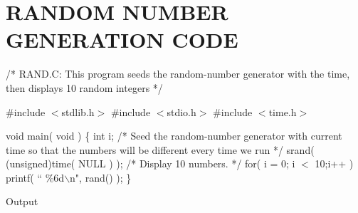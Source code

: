 \chapter{RANDOM NUMBER GENERATION CODE}

\noindent /* RAND.C: This program seeds the random-number generator with the time, then displays 10 random integers */ \newline

\noindent \#include $<$stdlib.h$>$ \newline
\noindent \#include $<$stdio.h$>$ \newline
\noindent \#include $<$time.h$>$ \newline

\noindent void main( void ) \newline
\noindent \{
   \newline \hspace*{2em} int i;
   \newline \hspace*{2em} /* Seed the random-number generator with current time so that the numbers
   \newline \hspace*{2em}    will be different every time we run */ \newline
   \newline \hspace*{2em} srand( (unsigned)time( NULL ) );
   \newline \hspace*{2em} /* Display 10 numbers. */
   \newline \hspace*{2em} for( i = 0;   i $<$ 10;i++ )
   \newline \hspace*{4em} printf( ``  \%6d$\backslash$n", rand() );
\newline \noindent \}

\noindent \newline Output \newline
\noindent {}
\noindent {}
\noindent {}
\noindent {}
\noindent {}
\noindent {}
\noindent {}
\noindent {}
\noindent {}
\noindent {}
